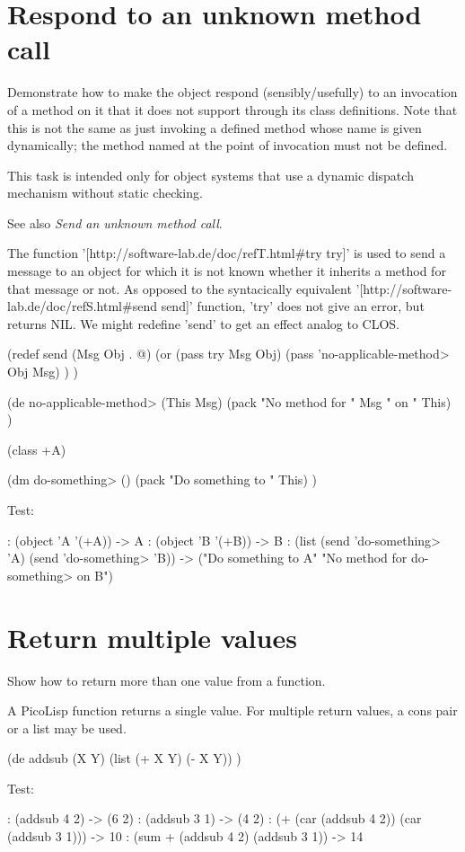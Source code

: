 \pagebreak{}
\section*{Respond to an unknown method call}

Demonstrate how to make the object respond (sensibly/usefully) to an
invocation of a method on it that it does not support through its class
definitions. Note that this is not the same as just invoking a defined
method whose name is given dynamically; the method named at the point of
invocation must not be defined.

This task is intended only for object systems that use a dynamic
dispatch mechanism without static checking.

See also \emph{Send an unknown method call}.

\begin{wideverbatim}

The function '[http://software-lab.de/doc/refT.html#try try]' is used to send a
message to an object for which it is not known whether it inherits a method for
that message or not. As opposed to the syntacically equivalent
'[http://software-lab.de/doc/refS.html#send send]' function, 'try' does not give
an error, but returns NIL. We might redefine 'send' to get an effect analog to
CLOS.

(redef send (Msg Obj . @)
   (or
      (pass try Msg Obj)
      (pass 'no-applicable-method> Obj Msg) ) )

(de no-applicable-method> (This Msg)
   (pack "No method for " Msg " on " This) )

(class +A)

(dm do-something> ()
   (pack "Do something to " This) )

Test:

: (object 'A '(+A))
-> A
: (object 'B '(+B))
-> B
: (list (send 'do-something> 'A) (send 'do-something> 'B))
-> ("Do something to A" "No method for do-something> on B")

\end{wideverbatim}

\pagebreak{}
\section*{Return multiple values}

Show how to return more than one value from a function.

\begin{wideverbatim}

A PicoLisp function returns a single value. For multiple return values, a cons
pair or a list may be used.

(de addsub (X Y)
   (list (+ X Y) (- X Y)) )

Test:

: (addsub 4 2)
-> (6 2)
: (addsub 3 1)
-> (4 2)
: (+ (car (addsub 4 2)) (car (addsub 3 1)))
-> 10
: (sum + (addsub 4 2) (addsub 3 1))
-> 14

\end{wideverbatim}

